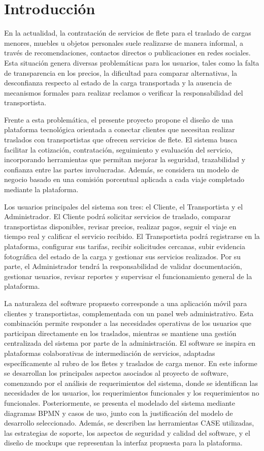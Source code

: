 \chapter{Introducción}

En la actualidad, la contratación de servicios de flete para el traslado de cargas menores, muebles u objetos personales suele realizarse de manera informal, a través de recomendaciones, contactos directos o publicaciones en redes sociales. Esta situación genera diversas problemáticas para los usuarios, tales como la falta de transparencia en los precios, la dificultad para comparar alternativas, la desconfianza respecto al estado de la carga transportada y la ausencia de mecanismos formales para realizar reclamos o verificar la responsabilidad del transportista.

Frente a esta problemática, el presente proyecto propone el diseño de una plataforma tecnológica orientada a conectar clientes que necesitan realizar traslados con transportistas que ofrecen servicios de flete. El sistema busca facilitar la cotización, contratación, seguimiento y evaluación del servicio, incorporando herramientas que permitan mejorar la seguridad, trazabilidad y confianza entre las partes involucradas. Además, se considera un modelo de negocio basado en una comisión porcentual aplicada a cada viaje completado mediante la plataforma.

Los usuarios principales del sistema son tres: el Cliente, el Transportista y el Administrador. El Cliente podrá solicitar servicios de traslado, comparar transportistas disponibles, revisar precios, realizar pagos, seguir el viaje en tiempo real y calificar el servicio recibido. El Transportista podrá registrarse en la plataforma, configurar sus tarifas, recibir solicitudes cercanas, subir evidencia fotográfica del estado de la carga y gestionar sus servicios realizados. Por su parte, el Administrador tendrá la responsabilidad de validar documentación, gestionar usuarios, revisar reportes y supervisar el funcionamiento general de la plataforma.

La naturaleza del software propuesto corresponde a una aplicación móvil para clientes y transportistas, complementada con un panel web administrativo. Esta combinación permite responder a las necesidades operativas de los usuarios que participan directamente en los traslados, mientras se mantiene una gestión centralizada del sistema por parte de la administración. El software se inspira en plataformas colaborativas de intermediación de servicios, adaptadas específicamente al rubro de los fletes y traslados de carga menor.
En este informe se desarrollan los principales aspectos asociados al proyecto de software, comenzando por el análisis de requerimientos del sistema, donde se identifican las necesidades de los usuarios, los requerimientos funcionales y los requerimientos no funcionales. Posteriormente, se presenta el modelado del sistema mediante diagramas BPMN y casos de uso, junto con la justificación del modelo de desarrollo seleccionado. Además, se describen las herramientas CASE utilizadas, las estrategias de soporte, los aspectos de seguridad y calidad del software, y el diseño de mockups que representan la interfaz propuesta para la plataforma.

